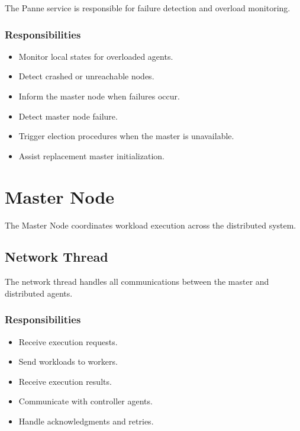 \documentclass[12pt,a4paper]{article}
\begin{document}
The Panne service is responsible for failure detection and overload monitoring.

\subsubsection{Responsibilities}

\begin{itemize}
    \item Monitor local states for overloaded agents.
    \item Detect crashed or unreachable nodes.
    \item Inform the master node when failures occur.
    \item Detect master node failure.
    \item Trigger election procedures when the master is unavailable.
    \item Assist replacement master initialization.
\end{itemize}

\newpage

\section{Master Node}

The Master Node coordinates workload execution across the distributed system.

\subsection{Network Thread}

The network thread handles all communications between the master and distributed agents.

\subsubsection{Responsibilities}

\begin{itemize}
    \item Receive execution requests.
    \item Send workloads to workers.
    \item Receive execution results.
    \item Communicate with controller agents.
    \item Handle acknowledgments and retries.
\end{itemize}
\end{document}
